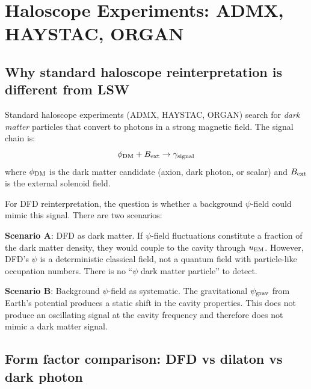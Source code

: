 \documentclass[11pt]{article}
\newcommand{\psigrav}{\psi_{\rm grav}}
\theoremstyle{definition}
\theoremstyle{remark}
\begin{document}
\section{Haloscope Experiments: ADMX, HAYSTAC, ORGAN}
\label{sec:haloscopes}

\subsection{Why standard haloscope reinterpretation is different from LSW}

Standard haloscope experiments (ADMX, HAYSTAC, ORGAN) search for
\emph{dark matter} particles that convert to photons in a strong
magnetic field. The signal chain is:
\begin{equation}
\phi_{\rm DM} + B_{\rm ext} \to \gamma_{\rm signal}
\label{eq:haloscope_chain}
\end{equation}
where $\phi_{\rm DM}$ is the dark matter candidate (axion, dark photon,
or scalar) and $B_{\rm ext}$ is the external solenoid field.

For DFD reinterpretation, the question is whether a background $\psi$-field
could mimic this signal. There are two scenarios:

\textbf{Scenario A}: DFD as dark matter. If $\psi$-field fluctuations
constitute a fraction of the dark matter density, they would couple
to the cavity through $u_{\rm EM}$. However, DFD's $\psi$ is a
deterministic classical field, not a quantum field with particle-like
occupation numbers. There is no ``$\psi$ dark matter particle'' to
detect.

\textbf{Scenario B}: Background $\psi$-field as systematic. The
gravitational $\psigrav$ from Earth's potential produces a static
shift in the cavity properties. This does not produce an oscillating
signal at the cavity frequency and therefore does not mimic a dark
matter signal.

\subsection{Form factor comparison: DFD vs dilaton vs dark photon}
\end{document}
